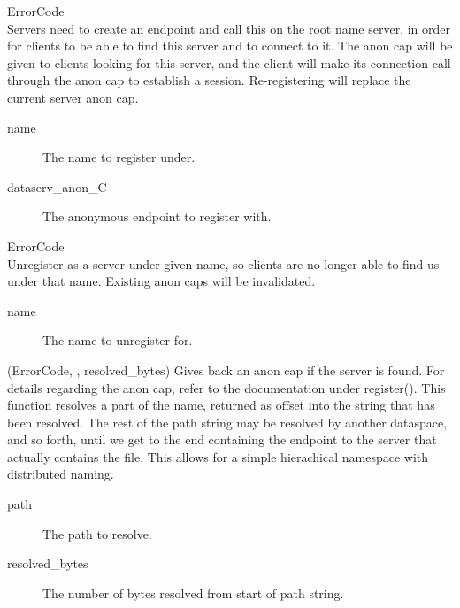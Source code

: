 \begin{description}

    \item {} {ErrorCode} \\
    Servers need to create an endpoint and call this on the root name server, in order for clients
    to be able to find this server and to connect to it. The anon cap will be given to clients
    looking for this server, and the client will make its connection call through the anon cap
    to establish a session.
    Re-registering will replace the current server anon cap.
    \begin{description}
        \item [name] The name to register under.
        \item [dataserv\_anon\_C] The anonymous endpoint to register with.
    \end{description}

    \item {} {ErrorCode} \\
    Unregister as a server under given name, so clients are no longer able to find us
    under that name. Existing anon caps will be invalidated.
    \begin{description}
        \item [name] The name to unregister for.
    \end{description}

    \item{}
        {(ErrorCode, , resolved\_bytes)}
    Gives back an anon cap if the server is found. For details regarding the anon cap, refer to
    the documentation under register(). This function resolves a part of the name, returned
    as offset into the string that has been resolved. The rest of the path string may be
    resolved by another dataspace, and so forth, until we get to the end containing the endpoint
    to the server that actually contains the file. This allows for a simple hierachical
    namespace with distributed naming.
    \begin{description}
        \item [path] The path to resolve.
        \item [resolved\_bytes] The number of bytes resolved from start of path string.
    \end{description}

\end{description}

